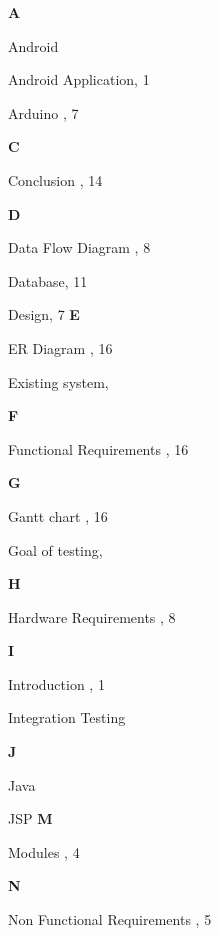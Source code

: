 \documentclass[12pt,a4paper,oneside]{report}
\begin{document}
{\begin{theindex}

\rhead{\empty}
\lhead{\empty}
\lfoot{\empty}
\vspace{.2in}
\large\textbf{A}
\item  Android 
\item  Android Application, 1
\item Arduino , 7

\vspace{.2in}
\large\textbf{C}
\item Conclusion , 14

\vspace{.2in}
\large\textbf{D}
\item Data Flow Diagram , 8
\item Database, 11
\item Design, 7
\vspace{.2in}
\large\textbf{E}
\item ER Diagram , 16
\item Existing system, 
\vspace{.2in}

\large\textbf{F}
\item Functional Requirements , 16
\vspace{.2in}

\large\textbf{G}
\item Gantt chart , 16
\item Goal of testing, 
\vspace{.2in}

\large\textbf{H}
\item Hardware Requirements , 8

\vspace{.2in}
\large\textbf{I}
\item Introduction , 1
\item Integration Testing

\vspace{.2in}
\large\textbf{J}
\item Java
\item  JSP
\vspace{.2in}
\large\textbf{M}
\item Modules , 4

\vspace{.2in}
\large\textbf{N}
\item Non Functional Requirements , 5


\end{theindex}}
\end{document}
